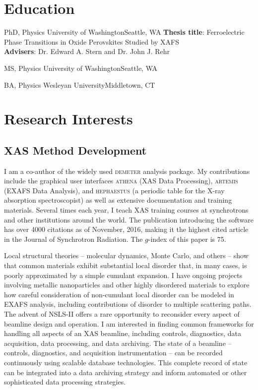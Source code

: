 \documentclass[11pt]{moderncv}
\begin{document}
\section{Education}
        {PhD, Physics}
        {University of Washington}{Seattle, WA}{}
        {\textbf{Thesis title}: Ferroelectric Phase Transitions in Oxide
          Perovskites Studied by XAFS\\
          \textbf{Advisers}: Dr. Edward A. Stern and Dr. John J. Rehr}  %

        {MS, Physics}
        {University of Washington}{Seattle, WA}{}{}

        {BA, Physics}
        {Wesleyan University}{Middletown, CT}{}{}

\pagebreak
\section{Research Interests}

\subsection{XAS Method Development}
%
{I am a co-author of the widely used \textsc{demeter} analysis
  package.  My contributions include the graphical user interfaces
  \textsc{athena} (XAS Data Processing), \textsc{artemis} (EXAFS Data
  Analysis), and \textsc{hephaestus} (a periodic table for the X-ray
  absorption spectroscopist) as well as extensive documentation and
  training materials.  Several times each year, I teach XAS training
  courses at synchrotrons and other institutions around the
  world. \newline{} The publication introducing the software has over
  4000 citations as of November, 2016, making it the highest cited
  article in the Journal of Synchrotron Radiation.  The $g$-index of
  this paper is 75.}

%
{Local structural theories -- molecular dynamics, Monte Carlo,
  and others -- show that common materials exhibit substantial local
  disorder that, in many cases, is poorly approximated by a simple
  cumulant expansion.  I have ongoing projects involving metallic
  nanoparticles and other highly disordered materials to explore how
  careful consideration of non-cumulant local disorder can be modeled
  in EXAFS analysis, including contributions of disorder to multiple
  scattering paths.}
%
%
{The advent of NSLS-II offers a rare opportunity to reconsider every
  aspect of beamline design and operation.  I am interested in finding
  common frameworks for handling all aspects of an XAS beamline,
  including controls, diagnostics, data acquisition, data processing,
  and data archiving.  The state of a beamline -- controls,
  diagnostics, and acquisition instrumentation -- can be recorded
  continuously using scalable database technologies.  This complete
  record of state can be integrated into a data archiving strategy and
  inform automated or other sophisticated data processing strategies.}
\end{document}
